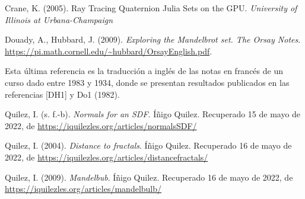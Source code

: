 \begin{thebibliography}{99}
 Crane, K. (2005). Ray Tracing Quaternion Julia Sets on the GPU. \textit{University of Illinois at Urbana-Champaign}

 Douady, A., Hubbard, J. (2009). \textit{Exploring the Mandelbrot set. The Orsay Notes}. \url{https://pi.math.cornell.edu/~hubbard/OrsayEnglish.pdf}.

Esta última referencia es la traducción a inglés de las notas en francés de un curso dado entre 1983 y 1934, donde se presentan resultados publicados en las referencias [DH1] y Do1 (1982).

 Quilez, I. (s. f.-b). \textit{Normals for an SDF}. Íñigo Quilez. Recuperado 15 de mayo de 2022, de \url{https://iquilezles.org/articles/normalsSDF/}

 Quilez, I. (2004). \textit{Distance to fractals}. Íñigo Quilez. Recuperado 16 de mayo de 2022, de \url{https://iquilezles.org/articles/distancefractals/}

 Quilez, I. (2009). \textit{Mandelbub}. Íñigo Quilez. Recuperado 16 de mayo de 2022, de \url{https://iquilezles.org/articles/mandelbulb/}
\end{thebibliography}
